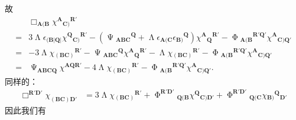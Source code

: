 故
\begin{equation*}
	\begin{aligned}
		& \Box _{\boldsymbol{A}(\boldsymbol{B}} \chi ^{\boldsymbol{A}}{}{_{\boldsymbol{C})}}^{\boldsymbol{R} '}\\
		= & 3\upLambda \epsilon _{(\boldsymbol{B}| \boldsymbol{Q}| } \chi ^{\boldsymbol{Q}}{}{_{\boldsymbol{C})}}^{\boldsymbol{R} '} -(\upPsi {_{\boldsymbol{ABC}}}^{\boldsymbol{Q}} +\upLambda \epsilon _{\boldsymbol{A}(\boldsymbol{C}} \epsilon {_{\boldsymbol{B})}}^{\boldsymbol{Q}} )\chi ^{\boldsymbol{A}}{}{_{\boldsymbol{Q}}}^{\boldsymbol{R} '} -\upPhi {_{\boldsymbol{A}(\boldsymbol{B}}}^{\boldsymbol{R}\mathbf{'}\boldsymbol{Q} '} \chi ^{\boldsymbol{A}}{}_{\boldsymbol{C})\boldsymbol{Q} '}\\
		= & -3\upLambda \chi {_{(\boldsymbol{BC})}}^{\boldsymbol{R} '} -\upPsi {_{\boldsymbol{ABC}}}^{\boldsymbol{Q}} \chi ^{\boldsymbol{A}}{}{_{\boldsymbol{Q}}}^{\boldsymbol{R} '} -\upLambda \chi {_{(\boldsymbol{BC})}}^{\boldsymbol{R} '} -\upPhi {_{\boldsymbol{A}(\boldsymbol{B}}}^{\boldsymbol{R}\mathbf{'}\boldsymbol{Q} '} \chi ^{\boldsymbol{A}}{}_{\boldsymbol{C})\boldsymbol{Q} '}\\
		= & \upPsi _{\boldsymbol{ABCQ}} \chi ^{\boldsymbol{AQR} '} -4\upLambda \chi {_{(\boldsymbol{BC})}}^{\boldsymbol{R} '} -\upPhi {_{\boldsymbol{A}(\boldsymbol{B}}}^{\boldsymbol{R}\mathbf{'}\boldsymbol{Q} '} \chi ^{\boldsymbol{A}}{}_{\boldsymbol{C})\boldsymbol{Q} '} .
	\end{aligned}
\end{equation*}
同样的：
\begin{equation*}
	\begin{aligned}
		\Box ^{\boldsymbol{R} '\boldsymbol{D} '} \chi _{(\boldsymbol{BC})\boldsymbol{D} '} & =3\upLambda \chi {_{(\boldsymbol{BC})}}^{\boldsymbol{R} '} +\upPhi ^{\boldsymbol{R} '\boldsymbol{D} '}{}_{\boldsymbol{Q}(\boldsymbol{B}} \chi ^{\boldsymbol{Q}}{}_{\boldsymbol{C})\boldsymbol{D} '} +\upPhi ^{\boldsymbol{R} '\boldsymbol{D} '}{}_{\boldsymbol{Q}(\boldsymbol{C}} \chi {_{\boldsymbol{B})}}^{\boldsymbol{Q}}{}_{\boldsymbol{D} '}
	\end{aligned}
\end{equation*}
因此我们有

